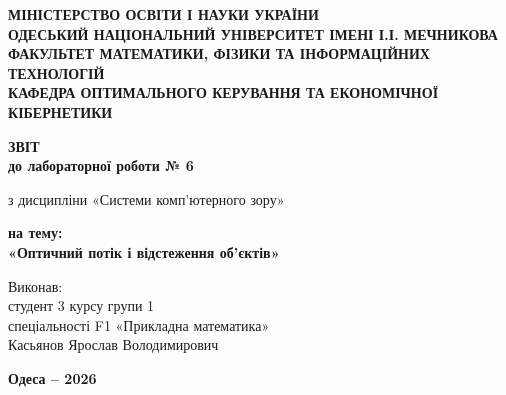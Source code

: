 \begin{titlepage}
    \thispagestyle{empty}
    \setlength{\parindent}{0pt}
    
    \begin{center}
        {\fontsize{12pt}{16pt}\selectfont\bfseries
        МІНІСТЕРСТВО ОСВІТИ І НАУКИ УКРАЇНИ\\[3pt]
        ОДЕСЬКИЙ НАЦІОНАЛЬНИЙ УНІВЕРСИТЕТ ІМЕНІ І.І. МЕЧНИКОВА\\[3pt]
        ФАКУЛЬТЕТ МАТЕМАТИКИ, ФІЗИКИ ТА ІНФОРМАЦІЙНИХ ТЕХНОЛОГІЙ\\[3pt]
        КАФЕДРА ОПТИМАЛЬНОГО КЕРУВАННЯ ТА ЕКОНОМІЧНОЇ КІБЕРНЕТИКИ\par}
    \end{center}

    \vspace{1.5cm}

    \begin{center}
        {\fontsize{18pt}{22pt}\selectfont\bfseries ЗВІТ\\
        до лабораторної роботи № 6\par}
        \vspace{0.4cm}
        {\fontsize{14pt}{18pt}\selectfont
        з дисципліни «Системи комп’ютерного зору»\par}
        \vspace{0.4cm}
        {\fontsize{16pt}{20pt}\selectfont\bfseries
        на тему:\\[6pt]
        «Оптичний потік і відстеження об’єктів»\par}
    \end{center}

    \vspace{1.5cm}

    \hfill
    \begin{minipage}{0.60\textwidth}
        \raggedright
        {\fontsize{14pt}{19pt}\selectfont
        Виконав:\\[2pt]
        студент 3 курсу групи 1\\[2pt]
        спеціальності F1 «Прикладна математика»\\[2pt]
        Касьянов Ярослав Володимирович
        }
    \end{minipage}

    \vfill

    \begin{center}
        {\fontsize{12pt}{14pt}\selectfont\bfseries Одеса -- 2026\par}
    \end{center}
\end{titlepage}

\setcounter{page}{2}
